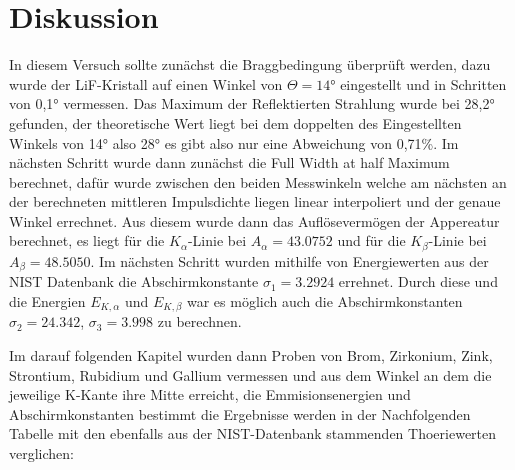 \section{Diskussion}
\label{Diskussion}
In diesem Versuch sollte zunächst die Braggbedingung überprüft werden, dazu wurde der LiF-Kristall auf einen 
Winkel von $\Theta=14°$ eingestellt und in Schritten von 0,1° vermessen. Das Maximum der Reflektierten 
Strahlung wurde bei 28,2° gefunden, der theoretische Wert liegt bei dem doppelten des Eingestellten Winkels
von 14° also 28° es gibt also nur eine Abweichung von 0,71\%.
Im nächsten Schritt wurde dann zunächst die Full Width at half Maximum berechnet, dafür wurde zwischen den beiden Messwinkeln 
welche am nächsten an der berechneten mittleren Impulsdichte liegen linear interpoliert und der genaue Winkel errechnet.
Aus diesem wurde dann das Auflösevermögen der Appereatur berechnet, es liegt für die $K_{\alpha}$-Linie bei $A_{\alpha}=43.0752$ und für die 
$K_{\beta}$-Linie bei $A_{\beta}=48.5050$. Im nächsten Schritt wurden mithilfe von Energiewerten aus der
NIST Datenbank die Abschirmkonstante $\sigma_1=3.2924$ errehnet. Durch diese und die Energien $E_{K,\alpha}$ und $E_{K,\beta}$ 
war es möglich auch die Abschirmkonstanten $\sigma_2=24.342$, $\sigma_3=3.998$ zu berechnen. 


Im darauf folgenden Kapitel wurden dann Proben von Brom, Zirkonium, Zink, Strontium, Rubidium und Gallium 
vermessen und aus dem Winkel an dem die jeweilige K-Kante ihre Mitte erreicht, die Emmisionsenergien und 
Abschirmkonstanten bestimmt die Ergebnisse werden in der Nachfolgenden Tabelle mit den ebenfalls aus der NIST-Datenbank stammenden
Thoeriewerten verglichen:

